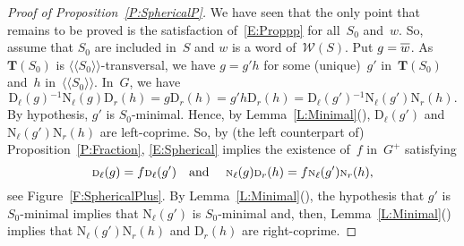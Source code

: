 \documentclass{amsart}
\numberwithin{equation}{section}
\theoremstyle{plain}
\theoremstyle{definition}
\newcounter{ITEM}
\begin{document}
\begin{proof}[Proof of Proposition~\ref{P:SphericalP}]
We have seen that the only point that remains to be proved is the satisfaction of~\eqref{E:Proppp} for all~${S}_0$ and~${w}$. So, assume that ${S}_0$ are included in~${S}$ and ${w}$ is a word of~${\mathcal{W}({S})}$. Put ${g} = {\overline{\vrule width0pt height5pt{w}}}$. As ${\boldsymbol{T}}({S}_0)$ is ${\langle\!\langle{{{S}_0}}\rangle\!\rangle}$-transversal, we have ${g} = {g}' {h}$ for some (unique)~${g}'$ in~${\boldsymbol{T}}({S}_0)$ and~${h}$ in~${\langle\!\langle{{{S}_0}}\rangle\!\rangle}$. In~${G}$, we have
\begin{equation}
\label{E:Spherical}
{{\scriptstyle\mathrm{D}}{_{\ell}}({g})}{^{-1}} {{\scriptstyle\mathrm{N}}{_{\ell}}({g})} {{\scriptstyle\mathrm{D}}{_{r}}({h})}
= {g} {{\scriptstyle\mathrm{D}}{_{r}}({h})} 
= {g}' {h} {{\scriptstyle\mathrm{D}}{_{r}}({h})}
= {{\scriptstyle\mathrm{D}}{_{\ell}}({{g}'})}{^{-1}} {{\scriptstyle\mathrm{N}}{_{\ell}}({{g}'})} {{\scriptstyle\mathrm{N}}{_{r}}({h})}.
\end{equation}
By hypothesis, ${g}'$ is ${S}_0$-minimal. Hence, by Lemma~\ref{L:Minimal}{\setcounter{ITEM}{2}\leavevmode\hbox{\rm()}}, ${{\scriptstyle\mathrm{D}}{_{\ell}}({{g}'})}$ and ${{\scriptstyle\mathrm{N}}{_{\ell}}({{g}'})} {{\scriptstyle\mathrm{N}}{_{r}}({h})}$ are left-coprime. So, by (the left counterpart of) Proposition~\ref{P:Fraction}, \eqref{E:Spherical} implies the existence of~${f}$ in~${G^{\scriptscriptstyle+}}$ satisfying 
$${{\scriptstyle\mathrm{D}}{_{\ell}}({g})} = {f} {{\scriptstyle\mathrm{D}}{_{\ell}}({{g}'})} \mbox{\quad and \quad} {{\scriptstyle\mathrm{N}}{_{\ell}}({g})} {{\scriptstyle\mathrm{D}}{_{r}}({h})} = {f} {{\scriptstyle\mathrm{N}}{_{\ell}}({{g}'})} {{\scriptstyle\mathrm{N}}{_{r}}({h})},$$
see Figure~\ref{F:SphericalPlus}. By Lemma~\ref{L:Minimal}{\setcounter{ITEM}{4}\leavevmode\hbox{\rm()}}, the hypothesis that ${g}'$ is ${S}_0$-minimal implies that ${{\scriptstyle\mathrm{N}}{_{\ell}}({{g}'})}$ is ${S}_0$-minimal and, then, 
Lemma~\ref{L:Minimal}{\setcounter{ITEM}{3}\leavevmode\hbox{\rm()}} implies that ${{\scriptstyle\mathrm{N}}{_{\ell}}({{g}'})} {{\scriptstyle\mathrm{N}}{_{r}}({h})}$ and ${{\scriptstyle\mathrm{D}}{_{r}}({h})}$ are right-coprime.


\end{proof}
\end{document}

